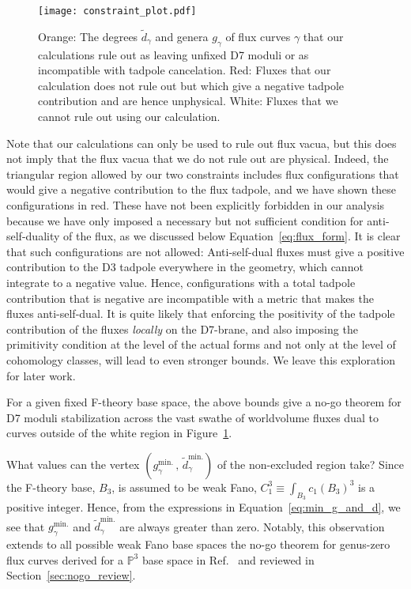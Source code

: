\documentclass[a4paper,12pt]{article}
\numberwithin{equation}{section}
\newcommand{\mbb}{\mathbb}
\newcommand{\fref}[1]{Figure~\ref{#1}}
\newcommand{\fthb}{B_3}				%
\newcommand{\crv}{\gamma}			%
\newcommand{\degr}[1]{\tilde{d}_{#1}}			%
\begin{document}
\begin{figure}[h]
\texttt{[image: constraint\_plot.pdf]}%
\caption{Orange: The degrees $\degr{\crv}$ and genera $g_\crv$ of flux curves $\crv$ that our calculations rule out as leaving unfixed  D7 moduli or as incompatible with tadpole cancelation. Red: Fluxes that our calculation does not rule out but which give a negative tadpole contribution and are hence unphysical. White: Fluxes that we cannot rule out using our calculation.}
\label{fig:constraint_plot}%
\end{figure}

Note that our calculations can only be used to rule out flux vacua, but this does not imply that the flux vacua that we do not rule out are physical. Indeed, the triangular region allowed by our two constraints includes flux configurations that would give a negative contribution to the flux tadpole, and we have shown these configurations in red. These have not been explicitly forbidden in our analysis because we have only imposed a necessary but not sufficient condition for anti-self-duality of the flux, as we discussed below Equation~\eqref{eq:flux_form}. It is clear that such configurations are not allowed: Anti-self-dual fluxes must give a positive contribution to the D3 tadpole everywhere in the geometry, which cannot integrate to a negative value. Hence, configurations with a total tadpole contribution that is negative are incompatible with a metric that makes the fluxes anti-self-dual. It is quite likely that enforcing the positivity of the tadpole contribution of the fluxes {\em locally} on the D7-brane,
and also imposing the primitivity condition at the level of the actual forms and not only at the level of cohomology classes, will lead to even stronger bounds. We leave this exploration for later work.

\medskip

For a given fixed F-theory base space, the above bounds give a no-go theorem for D7 moduli stabilization across the vast swathe of worldvolume fluxes dual to curves outside of the white region in \fref{fig:constraint_plot}.

What values can the vertex $( g_\crv^\mathrm{min.} \,,\, \degr{\crv}^\mathrm{min.})$ of the non-excluded region take? Since the F-theory base, $\fthb$, is assumed to be weak Fano, $C_1^3 \equiv \int_{\fthb}c_1(\fthb)^3$ is a positive integer. Hence, from the expressions in Equation~\eqref{eq:min_g_and_d}, we see that $g_\crv^\mathrm{min.}$ and $\degr{\crv}^\mathrm{min.}$ are always greater than zero. Notably, this observation extends to all possible weak Fano base spaces the no-go theorem for genus-zero flux curves derived for a $\mbb{P}^3$ base space in Ref.~\cite{Collinucci:2008pf} and reviewed in Section~\ref{sec:nogo_review}.
\end{document}
